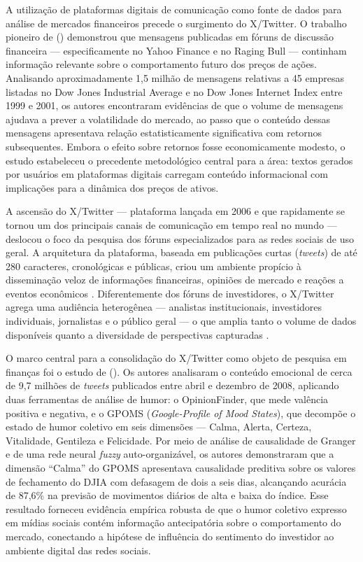 A utilização de plataformas digitais de comunicação como fonte de dados para análise de mercados financeiros precede o surgimento do X/Twitter. O trabalho pioneiro de
\citeauthor{antweiler2004} (\citeyear{antweiler2004}) demonstrou que mensagens publicadas em fóruns de discussão financeira --- especificamente no Yahoo Finance e no Raging Bull --- continham informação relevante sobre o comportamento futuro dos preços de ações. Analisando aproximadamente 1,5 milhão de mensagens relativas a 45 empresas listadas no Dow Jones Industrial Average e no Dow Jones Internet Index entre 1999 e 2001, os autores encontraram evidências de que o volume de mensagens ajudava a prever a volatilidade do mercado, ao passo que o conteúdo dessas mensagens apresentava relação estatisticamente significativa com retornos subsequentes. Embora o efeito sobre retornos fosse economicamente modesto, o estudo estabeleceu o precedente metodológico central para a área: textos gerados por usuários em plataformas digitais carregam conteúdo informacional com implicações para a dinâmica dos preços de ativos.

A ascensão do X/Twitter --- plataforma lançada em 2006 e que rapidamente se tornou um dos principais canais de comunicação em tempo real no mundo --- deslocou o foco
da pesquisa dos fóruns especializados para as redes sociais de uso geral. A arquitetura da plataforma, baseada em publicações curtas (\textit{tweets}) de até 280 caracteres,
cronológicas e públicas, criou um ambiente propício à disseminação veloz de informações financeiras, opiniões de mercado e reações a eventos econômicos \cite{sprenger2014}.
Diferentemente dos fóruns de investidores, o X/Twitter agrega uma audiência heterogênea --- analistas institucionais, investidores individuais, jornalistas e o público geral --- o que amplia tanto o volume de dados disponíveis quanto a diversidade de perspectivas capturadas \cite{mao2011}.

O marco central para a consolidação do X/Twitter como objeto de pesquisa em finanças foi o estudo de \citeauthor{bollen2011} (\citeyear{bollen2011}). Os autores analisaram
o conteúdo emocional de cerca de 9,7 milhões de \textit{tweets} publicados entre abril e dezembro de 2008, aplicando duas ferramentas de análise de humor: o OpinionFinder,
que mede valência positiva e negativa, e o GPOMS (\textit{Google-Profile of Mood States}), que decompõe o estado de humor coletivo em seis dimensões --- Calma, Alerta, Certeza, Vitalidade, Gentileza e Felicidade. Por meio de análise de causalidade de Granger e de uma rede neural \textit{fuzzy} auto-organizável, os autores demonstraram que a dimensão ``Calma'' do GPOMS apresentava causalidade preditiva sobre os valores de fechamento do DJIA com defasagem de dois a seis dias, alcançando acurácia de 87,6\% na
previsão de movimentos diários de alta e baixa do índice. Esse resultado forneceu evidência empírica robusta de que o humor coletivo expresso em mídias sociais contém
informação antecipatória sobre o comportamento do mercado, conectando a hipótese de influência do sentimento do investidor \cite{baker2007} ao ambiente digital das
redes sociais.

